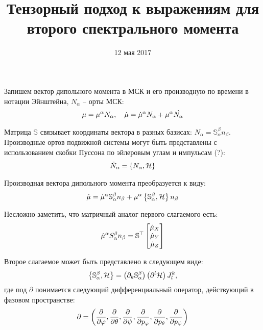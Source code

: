 \documentclass[12pt]{article}
\title{Тензорный подход к выражениям для второго спектрального момента}
\date{12 мая 2017}
\newcommand{\bbS}{\mathbb{S}}
\newcommand{\mH}{\mathcal{H}}
\newcommand{\lb}{\left(}
\newcommand{\rb}{\right)}
\newcommand{\lcb}{\left\{}
\newcommand{\rcb}{\right\}}
\begin{document}
\maketitle

Запишем вектор дипольного момента в МСК и его производную по времени в нотации Эйнштейна, $N_\alpha$ -- орты МСК:
\begin{gather}
	\mu = \mu^\alpha N_\alpha, \quad \dot{\mu} = \dot{\mu}^\alpha N_\alpha + \mu^\alpha \dot{N_\alpha} \notag
\end{gather}

Матрица $\bbS$ связывает координаты вектора в разных базисах: $N_\alpha = \bbS^\beta_\alpha n_\beta$. Производные ортов подвижной системы могут быть представлены с использованием скобки Пуссона по эйлеровым углам и импульсам (?):
\begin{gather}
	\dot{N}_\alpha = \lcb N_\alpha, \mH \rcb \notag
\end{gather}

Производная вектора дипольного момента преобразуется к виду:
\begin{gather}
	\dot{\mu} = \dot{\mu}^\alpha \bbS^\beta_\alpha n_\beta + \mu^\alpha \lcb \bbS^\beta_\alpha , \mH \rcb n_\beta \notag
\end{gather}

Несложно заметить, что матричный аналог первого слагаемого есть:
\begin{gather}
	\dot{\mu}^\alpha S^\beta_\alpha n_\beta = \bbS^\top 
	\begin{bmatrix}
		\dot{\mu}_X \\
		\dot{\mu}_Y \\
		\dot{\mu}_Z
	\end{bmatrix} \notag
\end{gather}

Второе слагаемое может быть представлено в следующем виде:
\begin{gather}
	\lcb \bbS_\alpha^\beta , \mH \rcb = \lb \partial_k \bbS_\alpha^\beta \rb \lb \partial^l \mH \rb J^{k}_{l}, \notag
\end{gather}
где под $\partial$ понимается следующий дифференциальный оператор, действующий в фазовом пространстве: 
\begin{gather}
	\partial = \lb \frac{\partial}{\partial \varphi},  
		       \frac{\partial}{\partial \theta},
 		       \frac{\partial}{\partial \psi},
 	   	       \frac{\partial}{\partial p_\varphi},
 		       \frac{\partial}{\partial p_\theta},
 		       \frac{\partial}{\partial p_\psi} \rb \notag
\end{gather}
\end{document}
